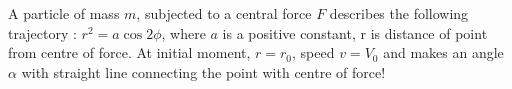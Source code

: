 \documentclass[11pt,a4paper]{scrartcl}
\begin{document}
\begin{problem}

A particle of mass $m$, subjected to a central force $F$ describes the following trajectory : $r ^ 2 = a \cos 2\phi$, where $a$ is a positive constant, r is distance of point from centre of force. At initial moment, $r= r_0$, speed $v=V_0$ and makes an angle $\alpha$ with straight line connecting the point with centre of force! \\

\begin{center}
    


\begin{tikzpicture}[x=0.75pt,y=0.75pt,yscale=-1,xscale=1]


\end{tikzpicture}
\end{center}
\end{problem}
\end{document}
